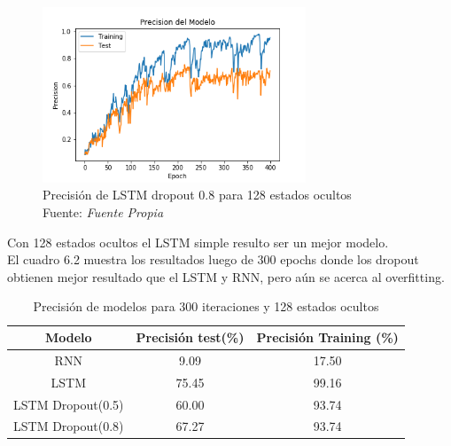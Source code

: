 \begin{figure}[H]
	\centering
	\includegraphics[width=0.7\textwidth]{Figures/lstm_400drop08_prec_13mfcc}
	\caption{Precisión de LSTM dropout 0.8 para 128 estados ocultos\\ Fuente: {\textit{Fuente Propia}}}
	\label{LSTMdropout8}
\end{figure} 
Con 128 estados ocultos el LSTM simple resulto ser un mejor modelo.\\
 El cuadro 6.2 muestra los resultados luego de 300 epochs donde los dropout obtienen mejor resultado que el LSTM y RNN, pero aún se acerca al overfitting.

\begin{table}[H]
	\centering
	\begin{tabular}{|c|c|c|}
		\hline
		\rowcolor{Gray}  Modelo & Precisión test(\%) & Precisión Training (\%)\\ \hline
		RNN &        9.09  &             17.50   \\ \hline

		LSTM &        75.45  &          99.16      \\ \hline

		LSTM Dropout(0.5) &  60.00         &     93.74         \\ \hline

		LSTM Dropout(0.8) &	67.27		&	93.74		\\ \hline

	\end{tabular}
	\caption{Precisión de modelos para 300 iteraciones y 128 estados ocultos}
\end{table}
\newpage
